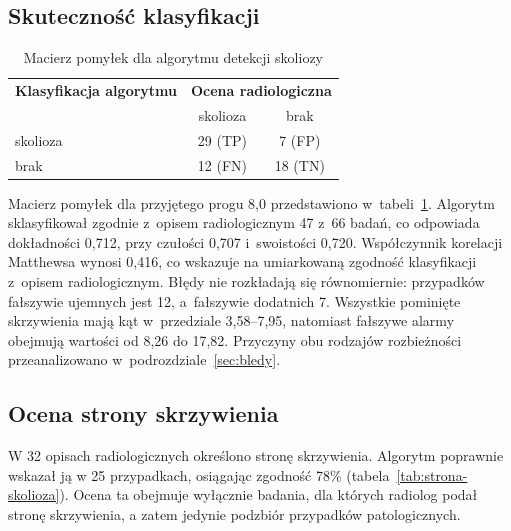 \subsection{Skuteczność klasyfikacji}
\label{subsec:skutecznosc-skolioza}

\begin{table}[H]
    \centering
    \captionsetup{justification=centering, font=small}
    \caption{Macierz pomyłek dla algorytmu detekcji skoliozy}
    \label{tab:macierz-skolioza}
    \begin{tabular}{lcc}
        \hline
        \textbf{Klasyfikacja algorytmu} & \multicolumn{2}{c}{\textbf{Ocena radiologiczna}} \\
        & skolioza & brak    \\
        \hline
        skolioza & 29 (TP)  & 7 (FP)  \\
        brak     & 12 (FN)  & 18 (TN) \\
        \hline
    \end{tabular}
\end{table}

Macierz pomyłek dla przyjętego progu 8,0\degree{} przedstawiono w~tabeli~\ref{tab:macierz-skolioza}.
Algorytm sklasyfikował zgodnie z~opisem radiologicznym 47 z~66 badań, co odpowiada dokładności 0,712, przy czułości 0,707 i~swoistości 0,720.
Współczynnik korelacji Matthewsa wynosi 0,416, co wskazuje na umiarkowaną zgodność klasyfikacji z~opisem radiologicznym.
Błędy nie rozkładają się równomiernie: przypadków fałszywie ujemnych jest 12, a~fałszywie dodatnich 7.
Wszystkie pominięte skrzywienia mają kąt w~przedziale 3,58--7,95\degree{}, natomiast fałszywe alarmy obejmują wartości od 8,26\degree{} do 17,82\degree{}.
Przyczyny obu rodzajów rozbieżności przeanalizowano w~podrozdziale~\ref{sec:bledy}.
\subsection{Ocena strony skrzywienia}
\label{subsec:strona-skolioza}

W 32 opisach radiologicznych określono stronę skrzywienia. Algorytm poprawnie wskazał ją w 25 przypadkach, osiągając zgodność 78\% (tabela~\ref{tab:strona-skolioza}). Ocena ta obejmuje wyłącznie badania, dla których radiolog podał stronę skrzywienia, a zatem jedynie podzbiór przypadków patologicznych.


